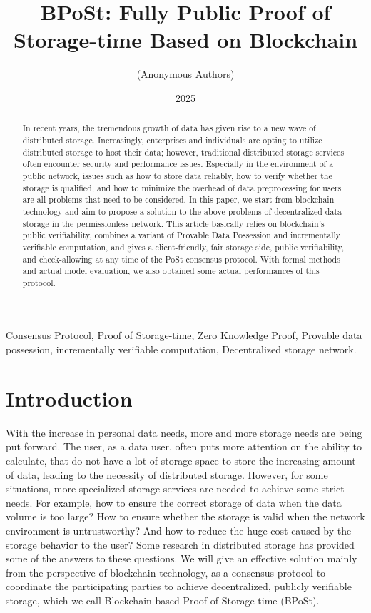 \documentclass[journal]{IEEEtran}
\title{\textbf{BPoSt}: Fully Public Proof of Storage-time Based on Blockchain}
\author{(Anonymous Authors)}
\date{2025}
\begin{document}
\maketitle

\begin{abstract}
    
    In recent years, the tremendous growth of data has given rise to a new wave of distributed storage. Increasingly, enterprises and individuals are opting to utilize distributed storage to host their data; however, traditional distributed storage services often encounter security and performance issues. Especially in the environment of a public network, issues such as how to store data reliably, how to verify whether the storage is qualified, and how to minimize the overhead of data preprocessing for users are all problems that need to be considered. In this paper, we start from blockchain technology and aim to propose a solution to the above problems of decentralized data storage in the permissionless network. This article basically relies on blockchain's public verifiability, combines a variant of Provable Data Possession and incrementally verifiable computation, and gives a client-friendly, fair storage side, public verifiability, and check-allowing at any time of the PoSt consensus protocol. With formal methods and actual model evaluation, we also obtained some actual performances of this protocol.
\end{abstract}

\begin{IEEEkeywords}
Consensus Protocol, Proof of Storage-time, Zero Knowledge Proof, Provable data possession, incrementally verifiable computation, Decentralized storage network.
\end{IEEEkeywords}

\section{Introduction}

With the increase in personal data needs, more and more storage needs are being put forward. The user, as a data user, often puts more attention on the ability to calculate, that do not have a lot of storage space to store the increasing amount of data, leading to the necessity of distributed storage. However, for some situations, more specialized storage services are needed to achieve some strict needs. For example, how to ensure the correct storage of data when the data volume is too large? How to ensure whether the storage is valid when the network environment is untrustworthy? And how to reduce the huge cost caused by the storage behavior to the user? Some research in distributed storage has provided some of the answers to these questions. We will give an effective solution mainly from the perspective of blockchain technology, as a consensus protocol to coordinate the participating parties to achieve decentralized, publicly verifiable storage, which we call Blockchain-based Proof of Storage-time (BPoSt).
\end{document}
